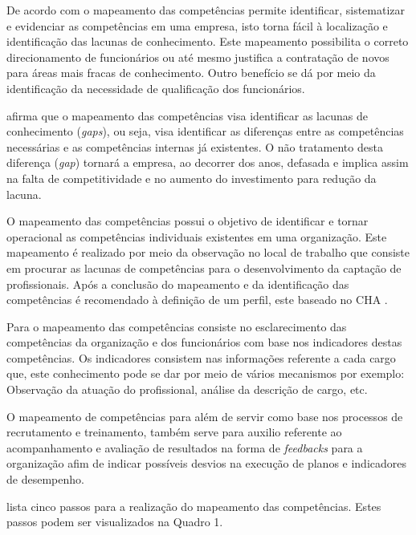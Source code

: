 De acordo com  o mapeamento das competências permite identificar, sistematizar e evidenciar as competências em uma empresa, isto torna fácil à localização e identificação das lacunas de conhecimento. Este mapeamento possibilita o correto direcionamento de funcionários ou até mesmo justifica a contratação de novos para áreas mais fracas de conhecimento. Outro benefício se dá por meio da identificação da necessidade de qualificação dos funcionários.

 afirma que o mapeamento das competências visa identificar as lacunas de conhecimento (\textit{gaps}), ou seja, visa identificar as diferenças entre as competências necessárias e as competências internas já existentes. O não tratamento desta diferença (\textit{gap}) tornará a empresa, ao decorrer dos anos, defasada e implica assim na falta de competitividade e no aumento do investimento para redução da lacuna.

O mapeamento das competências possui o objetivo de identificar e tornar operacional as competências individuais existentes em uma organização. Este mapeamento é realizado por meio da observação no local de trabalho que consiste em procurar as lacunas de competências para o desenvolvimento da captação de profissionais. Após a conclusão do mapeamento e da identificação das competências é recomendado à definição de um perfil, este baseado no CHA \cite{publica2012analise}.

Para  o mapeamento das competências consiste no esclarecimento das competências da organização e dos funcionários com base nos indicadores destas competências. Os indicadores consistem nas informações referente a cada cargo que, este conhecimento pode se dar por meio de vários mecanismos por exemplo: Observação da atuação do profissional, análise da descrição de cargo, etc.

O mapeamento de competências para  além de servir como base nos processos de recrutamento e treinamento, também serve para auxilio referente ao acompanhamento e avaliação de resultados na forma de \textit{feedbacks} para a organização afim de indicar possíveis desvios na execução de planos e indicadores de desempenho.
\vspace{30mm}

 lista cinco passos para a realização do mapeamento das competências. Estes passos podem ser visualizados na Quadro 1.


